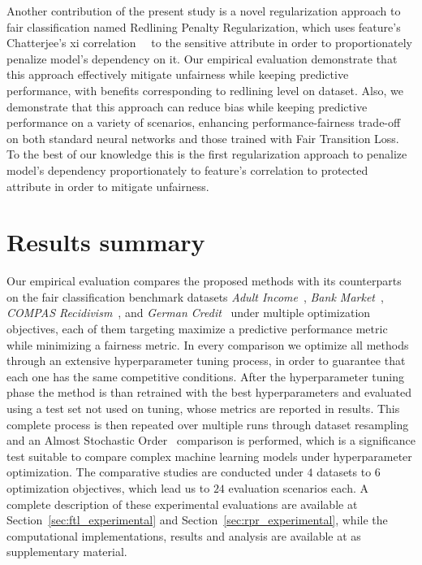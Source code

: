 Another contribution of the present study is a novel regularization approach to fair classification named Redlining Penalty Regularization, which uses feature's Chatterjee's xi correlation~~\citep{chatterjee2020new}  to the sensitive attribute in order to proportionately penalize model's dependency on it. Our empirical evaluation demonstrate that this approach effectively mitigate unfairness while keeping predictive performance, with benefits corresponding to redlining level on dataset. Also, we demonstrate that this approach can reduce bias while keeping predictive performance on a variety of scenarios, enhancing performance-fairness trade-off on both standard neural networks and those trained with Fair Transition Loss. To the best of our knowledge this is the first regularization approach to penalize model's dependency proportionately to feature's correlation to protected attribute in order to mitigate unfairness. 

\section{Results summary}

Our empirical evaluation compares the proposed methods with its counterparts on the fair classification benchmark datasets \textit{Adult Income}~\citep{misc_adult_2}, \textit{Bank Market}~\citep{misc_bank_marketing_222}, \textit{COMPAS Recidivism}~\citep{misc_compas}, and \textit{German Credit}~\citep{misc_statlog_(german_credit_data)_144} under multiple optimization objectives, each of them targeting maximize a predictive performance metric while minimizing a fairness metric. In every comparison we optimize all methods through an extensive hyperparameter tuning process, in order to guarantee that each one has the same competitive conditions. After the hyperparameter tuning phase the method is than retrained with the best hyperparameters and evaluated using a test set not used on tuning, whose metrics are reported in results. This complete process is then repeated over multiple runs through dataset resampling and an Almost Stochastic Order~\citep{dror2019deep} comparison is performed, which is a significance test suitable to compare complex machine learning models under hyperparameter optimization. The comparative studies are conducted under $4$ datasets to $6$ optimization objectives, which lead us to $24$ evaluation scenarios each. A complete description of these experimental evaluations are available at Section~\ref{sec:ftl_experimental} and Section~\ref{sec:rpr_experimental}, while the computational implementations, results and analysis are available at \cite{canalli2024_zenodo} as supplementary material.

